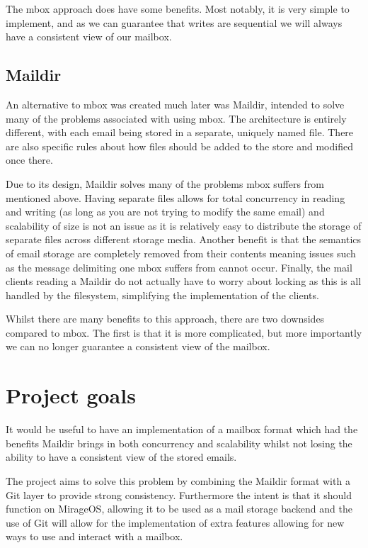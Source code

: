 The mbox approach does have some benefits. Most notably, it is very simple to implement, and as we can guarantee that writes are sequential we will always have a consistent view of our mailbox.

\subsection{Maildir}

An alternative to mbox was created much later was Maildir, intended to solve many of the problems associated with using mbox. The architecture is entirely different, with each email being stored in a separate, uniquely named file. There are also specific rules about how files should be added to the store and modified once there.

Due to its design, Maildir solves many of the problems mbox suffers from mentioned above. Having separate files allows for total concurrency in reading and writing (as long as you are not trying to modify the same email) and scalability of size is not an issue as it is relatively easy to distribute the storage of separate files across different storage media. Another benefit is that the semantics of email storage are completely removed from their contents meaning issues such as the message delimiting one mbox suffers from cannot occur. Finally, the mail clients reading a Maildir do not actually have to worry about locking as this is all handled by the filesystem, simplifying the implementation of the clients.

Whilst there are many benefits to this approach, there are two downsides compared to mbox. The first is that it is more complicated, but more importantly we can no longer guarantee a consistent view of the mailbox.

\section{Project goals}

It would be useful to have an implementation of a mailbox format which had the benefits Maildir brings in both concurrency and scalability whilst not losing the ability to have a consistent view of the stored emails.

The project aims to solve this problem by combining the Maildir format with a Git layer to provide strong consistency. Furthermore the intent is that it should function on MirageOS, allowing it to be used as a mail storage backend and the use of Git will allow for the implementation of extra features allowing for new ways to use and interact with a mailbox.
